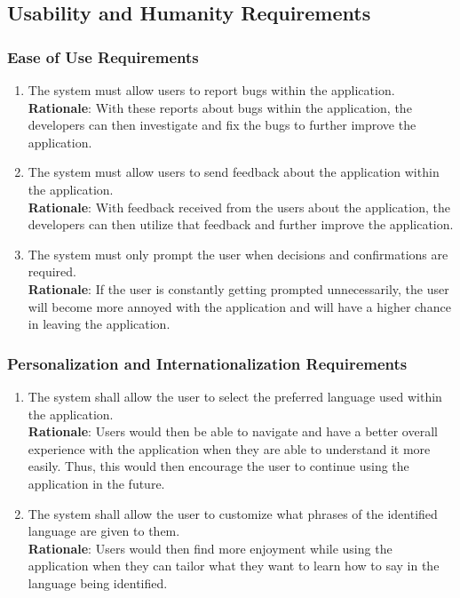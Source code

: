 

\subsection{Usability and Humanity Requirements}
\label{sub:usability_and_humanity_requirements}

\subsubsection{Ease of Use Requirements}
\label{ssub:ease_of_use_requirements}
\begin{enumerate}[{UH-EOU}1. ]
	\item The system must allow users to report bugs within the application.\\ \textbf{Rationale}: With these reports about bugs within the application, the developers can then investigate and fix the bugs to further improve the application.
	\item The system must allow users to send feedback about the application within the application.\\ \textbf{Rationale}: With feedback received from the users about the application, the developers can then utilize that feedback and further improve the application.
	\item The system must only prompt the user when decisions and confirmations are required.\\ \textbf{Rationale}: If the user is constantly getting prompted unnecessarily, the user will become more annoyed with the application and will have a higher chance in leaving the application.
\end{enumerate}


\subsubsection{Personalization and Internationalization Requirements}
\label{ssub:personalization_and_internationalization_requirements}
\begin{enumerate}[{UH-PI}1. ]
	\item The system shall allow the user to select the preferred language used within the application.
	\\ \textbf{Rationale}: Users would then be able to navigate and have a better overall experience with the application when they are able to understand it more easily. Thus, this would then encourage the user to continue using the application in the future.
	\item The system shall allow the user to customize what phrases of the identified language are given to them.
	\\ \textbf{Rationale}: Users would then find more enjoyment while using the application when they can tailor what they want to learn how to say in the language being identified.
\end{enumerate}


